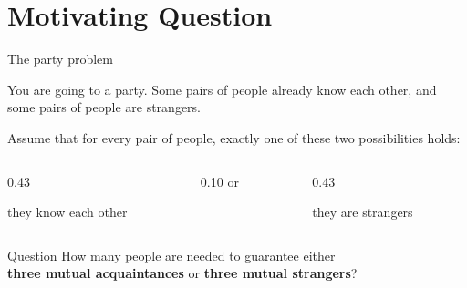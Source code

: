 \documentclass[aspectratio=169,11pt]{beamer}
\begin{document}
\section{Motivating Question}

\begin{frame}{The party problem}
\large

You are going to a party. Some pairs of people already know each other,
and some pairs of people are strangers.

\vspace{0.45cm}

Assume that for every pair of people, exactly one of these two possibilities holds:

\vspace{0.35cm}

\begin{center}
  \begin{columns}[c,onlytextwidth]
    \begin{column}{0.43\textwidth}
      \begin{block}{}
        \centering
        they know each other
      \end{block}
    \end{column}
    \begin{column}{0.10\textwidth}
      \centering or
    \end{column}
    \begin{column}{0.43\textwidth}
      \begin{block}{}
        \centering
        they are strangers
      \end{block}
    \end{column}
  \end{columns}
\end{center}

\vspace{0.35cm}

\begin{alertblock}{Question}
  \centering
  How many people are needed to guarantee either\\[0.08cm]
  \textbf{three mutual acquaintances} or \textbf{three mutual strangers}?
\end{alertblock}
\end{frame}
\end{document}
